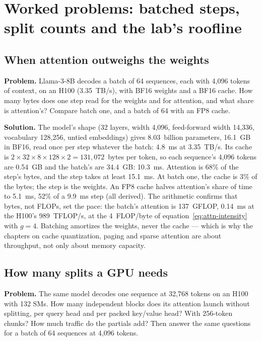 \section{Worked problems: batched steps, split counts and the lab's roofline}

\subsection{When attention outweighs the weights}
\textbf{Problem.} Llama-3-8B decodes a batch of 64 sequences, each with 4,096
tokens of context, on an H100 (3.35~TB/s), with BF16 weights and a BF16 cache.
How many bytes does one step read for the weights and for attention, and what
share is attention's? Compare batch one, and a batch of 64 with an FP8 cache.

\textbf{Solution.} The model's shape (32 layers, width 4,096, feed-forward width
14,336, vocabulary 128,256, untied embeddings) gives 8.03~billion parameters,
16.1~GB in BF16, read once per step whatever the batch: 4.8~ms at 3.35~TB/s. Its
cache is $2 \times 32 \times 8 \times 128 \times 2 = 131{,}072$~bytes per token,
so each sequence's 4,096 tokens are 0.54~GB and the batch's are 34.4~GB: 10.3~ms.
Attention is 68\% of the step's bytes, and the step takes at least 15.1~ms. At
batch one, the cache is 3\% of the bytes; the step is the weights. An FP8 cache
halves attention's share of time to 5.1~ms, 52\% of a 9.9~ms step (all derived).
The arithmetic confirms that bytes, not FLOPs, set the pace: the batch's
attention is 137~GFLOP, 0.14~ms at the H100's 989~TFLOP/s, at the 4~FLOP/byte of
equation~\eqref{eq:attn-intensity} with $g = 4$. Batching amortizes the weights,
never the cache --- which is why the chapters on cache quantization, paging and
sparse attention are about throughput, not only about memory capacity.

\subsection{How many splits a GPU needs}
\textbf{Problem.} The same model decodes one sequence at 32,768 tokens on an H100
with 132 SMs. How many independent blocks does its attention launch without
splitting, per query head and per packed key/value head? With 256-token
chunks? How much traffic do the partials add? Then answer the same questions
for a batch of 64 sequences at 4,096 tokens.

